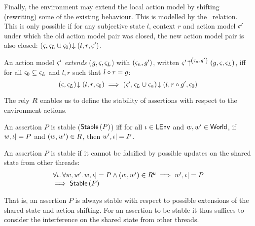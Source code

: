 Finally, the environment may extend the local action model by shifting (rewriting) some of the existing behaviour. This is modelled by the \shiftR\ relation. This is only possible if for any subjective state $l$, context $r$ and action model $\varsigma_{}'$ under which the old action model pair was closed, the new action model pair is also closed: $\left(\varsigma_{}, \varsigma_{L} \cup \varsigma_{0}\right) \!\downarrow \left(l, r, \varsigma_{}'\right)$. 
%
%
\begin{definition}\label{def:amodExtension}
An action model $\varsigma_{}'$ \emph{extends}  ($g, \varsigma_{}, \varsigma_{L}$) with $(\varsigma_{n}, g')$, written $\varsigma_{}' \!\uparrow^{\left(\varsigma_{n}, g'\right)} \left(g, \varsigma_{}, \varsigma_{L}\right)$, iff for all $\varsigma_{0} \subseteq \varsigma_{L}$ and $l, r$ such that $l \circ r = g$:
%
\[
	\left(\varsigma_{}, \varsigma_{L}\right) \!\downarrow \left(l, r, \varsigma_{0}\right) \implies \left(\varsigma_{}', \varsigma_{L} \cup \varsigma_{n}\right) \!\downarrow \left(l, r\circ g', \varsigma_{0}\right)
\]
%
\end{definition}
%
%
The rely $R$ enables us to define the stability of assertions with respect to the environment actions.
%
\begin{definition}[Stability] An assertion $P$ is stable ($\textsf{Stable}\left(P\right)$) iff for all $\iota \in \textsf{LEnv}$ and $w, w' \in \textsf{World}$, if $w, \iota |= P$ and $(w, w') \in R$, then $w', \iota |= P$.
\end{definition}
%
\begin{lemma}[Stability]
An assertion $P$ is stable if it cannot be falsified by possible updates on the shared state from other threads:
%
\[
\begin{array}{l}
	\forall \iota.\,\forall w, w'.\, 
    w, \iota |= P \land (w, w') \in R^{\textsf{u}} \implies
	 	w', \iota |= P\\
	 
	 \implies \textsf{Stable}\left(P\right)
\end{array}	 
\]
%
\end{lemma}
%
That is, an assertion $P$ is always stable with respect to possible extensions of the shared state and action shifting. For an assertion to be stable it thus suffices to consider the interference on the shared state from other threads.

